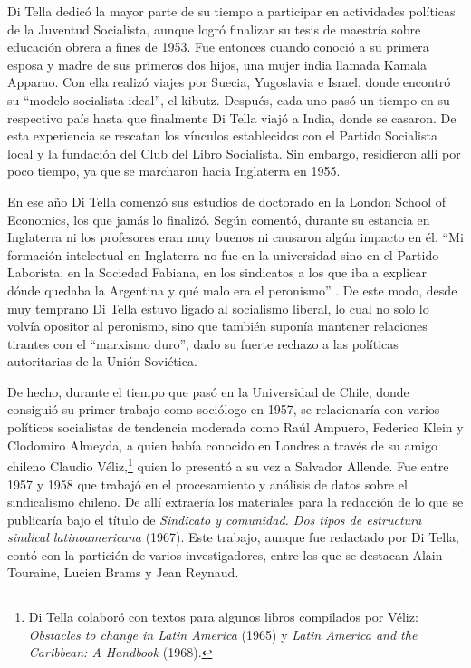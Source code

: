 Di Tella dedicó la mayor parte de su tiempo a participar en actividades políticas de la Juventud Socialista, aunque logró finalizar su tesis de maestría sobre educación obrera a fines de 1953. Fue entonces cuando conoció a su primera esposa y madre de sus primeros dos hijos, una mujer india llamada Kamala Apparao. Con ella realizó viajes por Suecia, Yugoslavia e Israel, donde encontró su \enquote{modelo socialista ideal}, el kibutz. Después, cada uno pasó un tiempo en su respectivo país hasta que finalmente Di Tella viajó a India, donde se casaron. De esta experiencia se rescatan los vínculos establecidos con el Partido Socialista local y la fundación del Club del Libro Socialista. Sin embargo, residieron allí por poco tiempo, ya que se marcharon hacia Inglaterra en 1955.

En ese año Di Tella comenzó sus estudios de doctorado en la London School of Economics, los que jamás lo finalizó. Según comentó, durante su estancia en Inglaterra ni los profesores eran muy buenos ni causaron algún impacto en él. \enquote{Mi formación intelectual en Inglaterra  no fue en la universidad sino en el Partido Laborista, en la Sociedad Fabiana, en los sindicatos a los que iba a explicar dónde quedaba la Argentina y qué malo era el peronismo} \parencite[270]{1553-CAMOU2009}. De este modo, desde muy temprano Di Tella estuvo ligado al socialismo liberal, lo cual no solo lo volvía opositor al peronismo, sino que también suponía mantener relaciones tirantes con el \enquote{marxismo duro}, dado su fuerte rechazo a las políticas autoritarias de la Unión Soviética.

De hecho, durante el tiempo que pasó en la Universidad de Chile, donde consiguió su primer trabajo como sociólogo en 1957, se relacionaría con varios políticos socialistas de tendencia moderada como Raúl Ampuero, Federico Klein y Clodomiro Almeyda, a quien había conocido en Londres a través de su amigo chileno Claudio Véliz,\footnote{Di Tella colaboró con textos para algunos libros compilados por Véliz: \emph{Obstacles to change in Latin America} (1965) y \emph{Latin America and the Caribbean: A Handbook} (1968).} quien lo presentó a su vez a Salvador Allende. Fue entre 1957 y 1958 que trabajó en el procesamiento y análisis de datos sobre el sindicalismo chileno. De allí extraería los materiales para la redacción de lo que se publicaría bajo el título de \emph{Sindicato y comunidad. Dos tipos de estructura sindical latinoamericana} (1967). Este trabajo, aunque fue redactado por Di Tella, contó con la partición de varios investigadores, entre los que se destacan Alain Touraine, Lucien Brams y Jean Reynaud.

